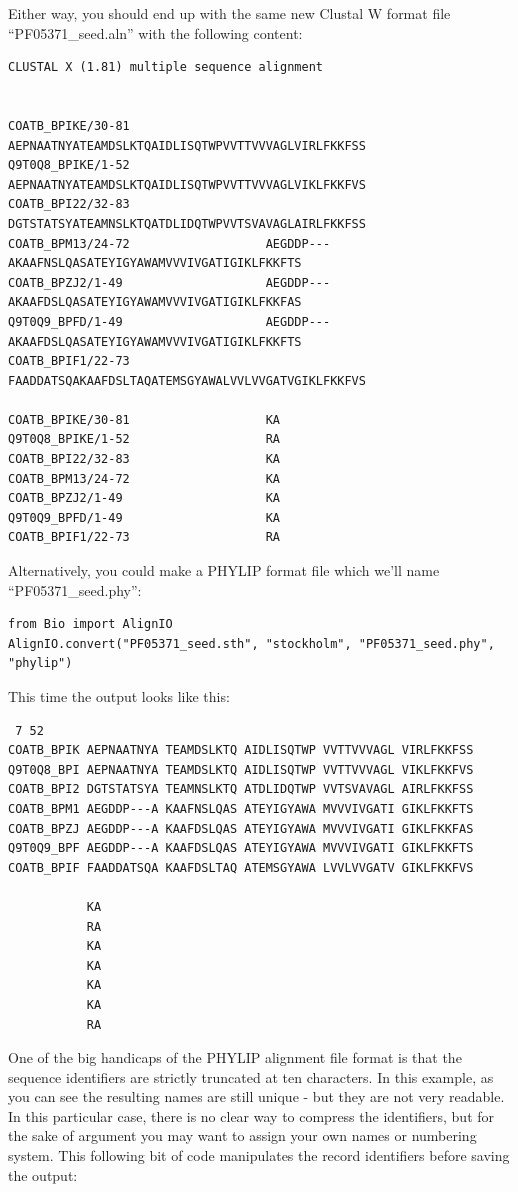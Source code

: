 \documentclass{report}
\begin{document}
Either way, you should end up with the same new Clustal W format file ``PF05371\_seed.aln'' with the following content:

\begin{verbatim}
CLUSTAL X (1.81) multiple sequence alignment


COATB_BPIKE/30-81                   AEPNAATNYATEAMDSLKTQAIDLISQTWPVVTTVVVAGLVIRLFKKFSS
Q9T0Q8_BPIKE/1-52                   AEPNAATNYATEAMDSLKTQAIDLISQTWPVVTTVVVAGLVIKLFKKFVS
COATB_BPI22/32-83                   DGTSTATSYATEAMNSLKTQATDLIDQTWPVVTSVAVAGLAIRLFKKFSS
COATB_BPM13/24-72                   AEGDDP---AKAAFNSLQASATEYIGYAWAMVVVIVGATIGIKLFKKFTS
COATB_BPZJ2/1-49                    AEGDDP---AKAAFDSLQASATEYIGYAWAMVVVIVGATIGIKLFKKFAS
Q9T0Q9_BPFD/1-49                    AEGDDP---AKAAFDSLQASATEYIGYAWAMVVVIVGATIGIKLFKKFTS
COATB_BPIF1/22-73                   FAADDATSQAKAAFDSLTAQATEMSGYAWALVVLVVGATVGIKLFKKFVS

COATB_BPIKE/30-81                   KA
Q9T0Q8_BPIKE/1-52                   RA
COATB_BPI22/32-83                   KA
COATB_BPM13/24-72                   KA
COATB_BPZJ2/1-49                    KA
Q9T0Q9_BPFD/1-49                    KA
COATB_BPIF1/22-73                   RA
\end{verbatim}

Alternatively, you could make a PHYLIP format file which we'll name ``PF05371\_seed.phy'':

\begin{verbatim}
from Bio import AlignIO
AlignIO.convert("PF05371_seed.sth", "stockholm", "PF05371_seed.phy", "phylip")
\end{verbatim}

This time the output looks like this:

\begin{verbatim}
 7 52
COATB_BPIK AEPNAATNYA TEAMDSLKTQ AIDLISQTWP VVTTVVVAGL VIRLFKKFSS
Q9T0Q8_BPI AEPNAATNYA TEAMDSLKTQ AIDLISQTWP VVTTVVVAGL VIKLFKKFVS
COATB_BPI2 DGTSTATSYA TEAMNSLKTQ ATDLIDQTWP VVTSVAVAGL AIRLFKKFSS
COATB_BPM1 AEGDDP---A KAAFNSLQAS ATEYIGYAWA MVVVIVGATI GIKLFKKFTS
COATB_BPZJ AEGDDP---A KAAFDSLQAS ATEYIGYAWA MVVVIVGATI GIKLFKKFAS
Q9T0Q9_BPF AEGDDP---A KAAFDSLQAS ATEYIGYAWA MVVVIVGATI GIKLFKKFTS
COATB_BPIF FAADDATSQA KAAFDSLTAQ ATEMSGYAWA LVVLVVGATV GIKLFKKFVS

           KA
           RA
           KA
           KA
           KA
           KA
           RA
\end{verbatim}

One of the big handicaps of the PHYLIP alignment file format is that the sequence identifiers are strictly truncated at ten characters.  In this example, as you can see the resulting names are still unique - but they are not very readable.  In this particular case, there is no clear way to compress the identifiers, but for the sake of argument you may want to assign your own names or numbering system.  This following bit of code manipulates the record identifiers before saving the output:
\end{document}
